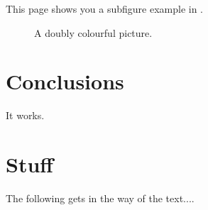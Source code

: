 \documentclass{ecsarticle}     %
\begin{document}
This page shows you a subfigure example in .
\begin{figure}[!htb]
  \centering
  \caption{A doubly colourful picture.}
  \label{Figure:figsubex}
\end{figure}
\section{Conclusions} \label{Section: Conclusions}
It works.
\backmatter


\appendix
\section{Stuff} \label{Section:Stuff}
The following gets in the way of the text....
\end{document}
